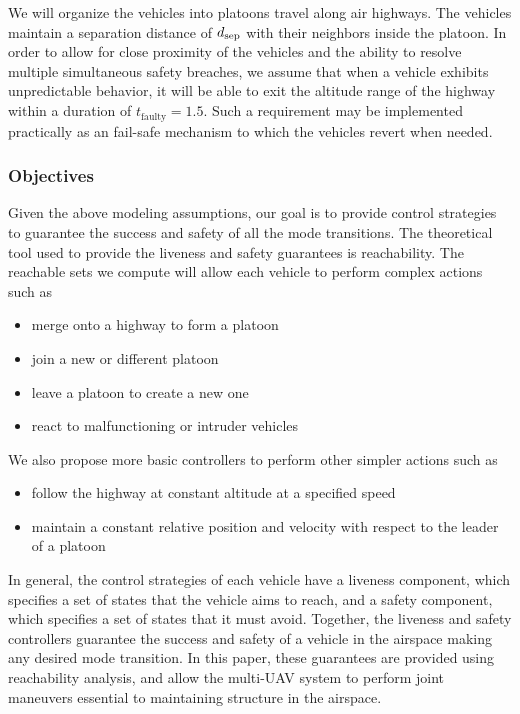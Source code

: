 We will organize the vehicles into platoons travel along air highways. The vehicles maintain a separation distance of $d_\text{sep}$ with their neighbors inside the platoon. In order to allow for close proximity of the vehicles and the ability to resolve multiple simultaneous safety breaches, we assume that when a vehicle exhibits unpredictable behavior, it will be able to exit the altitude range of the highway within a duration of $t_\text{faulty}=1.5$. Such a requirement may be implemented practically as an fail-safe mechanism to which the vehicles revert when needed.

\subsubsection{Objectives}
Given the above modeling assumptions, our goal is to provide control strategies to guarantee the success and safety of all the mode transitions. The theoretical tool used to provide the liveness and safety guarantees is reachability. The reachable sets we compute will allow each vehicle to perform complex actions such as 


\begin{itemize}
\item merge onto a highway to form a platoon
\item join a new or different platoon
\item leave a platoon to create a new one
\item react to malfunctioning or intruder vehicles
\end{itemize}

We also propose more basic controllers to perform other simpler actions such as
\begin{itemize}
\item follow the highway at constant altitude at a specified speed
\item maintain a constant relative position and velocity with respect to the leader of a platoon
\end{itemize}

In general, the control strategies of each vehicle have a liveness component, which specifies a set of states that the vehicle aims to reach, and a safety component, which specifies a set of states that it must avoid. Together, the liveness and safety controllers guarantee the success and safety of a vehicle in the airspace making any desired mode transition. In this paper, these guarantees are provided using reachability analysis, and allow the multi-UAV system to perform joint maneuvers essential to maintaining structure in the airspace.
